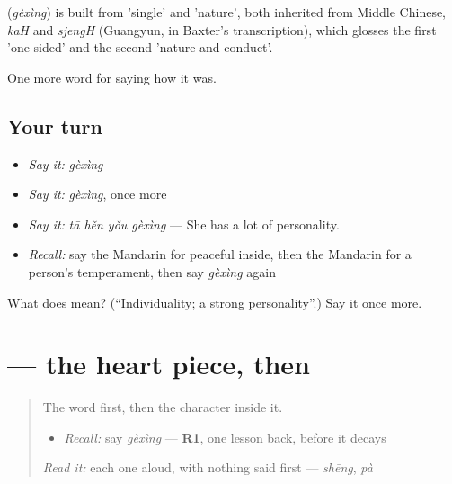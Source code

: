 \begin{cousinweb}
\textbf{} (\emph{gèxìng}) is built from  'single' and  'nature', both inherited from Middle Chinese, \emph{kaH} and \emph{sjengH} (Guangyun, in Baxter's transcription), which glosses the first 'one-sided' and the second 'nature and conduct'.
\end{cousinweb}

\begin{grammarlens}[title={What you've built}]
One more word for saying how it was.
\end{grammarlens}

\subsection*{Your turn}
\begin{itemize}
\raggedright
  \item \emph{Say it:} \emph{gèxìng}
  \item \emph{Say it:} \emph{gèxìng}, once more
  \item \emph{Say it:} \emph{tā hěn yǒu gèxìng} — She has a lot of personality.
  \item \emph{Recall:} say the Mandarin for peaceful inside, then the Mandarin for a person's temperament, then say \emph{gèxìng} again
\end{itemize}

\begin{tcolorbox}[breakable,colback=teal!4,colframe=teal!35!black,title={Before you move on}]
What does  mean? (\textquotedblleft{}Individuality; a strong personality\textquotedblright{}.) Say it once more.
\end{tcolorbox}
\section[\texorpdfstring{\zh{性} (xìng)}{性 (xìng)}]{ — the heart piece, then }

\label{lesson:ZH-W467-xing-nature}



\begin{quote}
The word first, then the character inside it.

\begin{itemize}
\raggedright
  \item \emph{Recall:} say \emph{gèxìng} — \textbf{R1}, one lesson back, before it decays
\end{itemize}

\begin{quote}
 
\end{quote}

\emph{Read it:} each one aloud, with nothing said first — \emph{shēng}, \emph{pà}
\end{quote}

